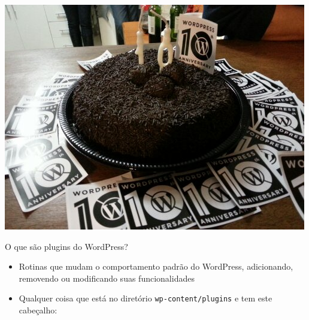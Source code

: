\documentclass{beamer}
\begin{document}
\begin{frame}
\begin{center}
  \includegraphics[width=\textwidth]{./img/wp10.jpg}
\end{center}
\end{frame}

\begin{frame}{O que são plugins do WordPress?}
\begin{itemize}
  \pause \item Rotinas que mudam o comportamento padrão do WordPress,
    adicionando, removendo ou modificando suas funcionalidades
  \pause \item Qualquer coisa que está no diretório \texttt{wp-content/plugins}
    e tem este cabeçalho:
\end{itemize}
\end{frame}

\begin{frame}
  
\end{frame}
\end{document}
